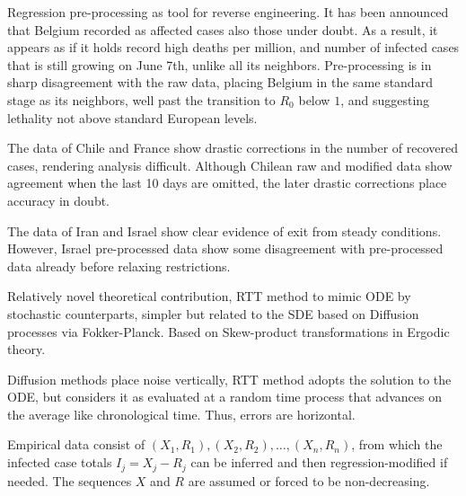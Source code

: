 \documentclass{article}
\begin{document}
\bigskip

\noindent Regression pre-processing as tool for reverse engineering. It has been announced that Belgium recorded as affected cases also those under doubt. As a result, it appears as if it holds record high deaths per million, and number of infected cases that is still growing on June 7th, unlike all its neighbors. Pre-processing is in sharp disagreement with the raw data, placing Belgium in the same standard stage as its neighbors, well past the transition to $R_0$ below $1$, and suggesting lethality not above standard European levels.

\bigskip

\noindent The data of Chile and France show drastic corrections in the number of recovered cases, rendering analysis difficult. Although Chilean raw and modified data show agreement when the last 10 days are omitted, the later drastic corrections place accuracy in doubt.

\bigskip

\noindent The data of Iran and Israel show clear evidence of exit from steady conditions. However, Israel pre-processed data show some disagreement with pre-processed data already before relaxing restrictions.

\newpage


\bigskip

\noindent Relatively novel theoretical contribution, RTT method to mimic ODE by stochastic counterparts, simpler but related to the SDE based on Diffusion processes via Fokker-Planck. Based on Skew-product transformations in Ergodic theory.

\bigskip

\noindent Diffusion methods place noise vertically, RTT method adopts the solution to the ODE, but considers it as evaluated at a random time process that advances on the average like chronological time. Thus, errors are horizontal.

\bigskip

\noindent Empirical data consist of $(X_1,R_1), (X_2,R_2), \dots, (X_n, R_n)$, from which the infected case totals \linebreak $I_j=X_j-R_j$ can be inferred and then regression-modified if needed. The sequences $X$ and $R$ are assumed or forced to be non-decreasing.

\bigskip
\end{document}
